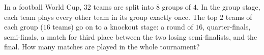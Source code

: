 In a football World Cup, $32$ teams are split into $8$ groups of $4$. In the group stage, each team plays every other team in its group exactly once. The top $2$ teams of each group ($16$ teams) go on to a knockout stage: a round of $16$, quarter-finals, semi-finals, a match for third place between the two losing semi-finalists, and the final. How many matches are played in the whole tournament?
